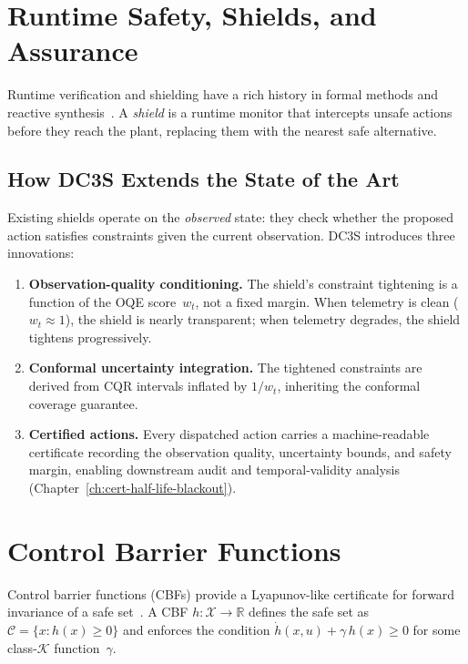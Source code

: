 \section{Runtime Safety, Shields, and Assurance}

Runtime verification and shielding have a rich history in formal methods
and reactive synthesis~\cite{bloem2015shield}.  A \emph{shield} is a
runtime monitor that intercepts unsafe actions before they reach the
plant, replacing them with the nearest safe alternative.

\subsection{How DC3S Extends the State of the Art}

Existing shields operate on the \emph{observed} state: they check whether
the proposed action satisfies constraints given the current observation.
DC3S introduces three innovations:

\begin{enumerate}
  \item \textbf{Observation-quality conditioning.}  The shield's
    constraint tightening is a function of the OQE score~$w_t$, not a
    fixed margin.  When telemetry is clean ($w_t \approx 1$), the shield
    is nearly transparent; when telemetry degrades, the shield tightens
    progressively.
  \item \textbf{Conformal uncertainty integration.}  The tightened
    constraints are derived from CQR intervals inflated by $1/w_t$,
    inheriting the conformal coverage guarantee.
  \item \textbf{Certified actions.}  Every dispatched action carries a
    machine-readable certificate recording the observation quality,
    uncertainty bounds, and safety margin, enabling downstream audit
    and temporal-validity analysis
    (Chapter~\ref{ch:cert-half-life-blackout}).
\end{enumerate}

\section{Control Barrier Functions}

Control barrier functions (CBFs) provide a Lyapunov-like certificate for
forward invariance of a safe set~\cite{ames2019control}.  A CBF
$h : \mathcal{X} \to \mathbb{R}$ defines the safe set as
$\mathcal{C} = \{x : h(x) \ge 0\}$ and enforces the condition
$\dot{h}(x, u) + \gamma\, h(x) \ge 0$ for some class-$\mathcal{K}$
function~$\gamma$.

